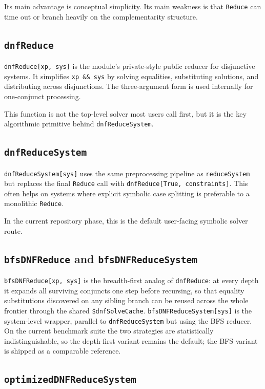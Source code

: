 \documentclass[11pt]{article}
\begin{document}
Its main advantage is conceptual simplicity. Its main weakness is that \texttt{Reduce} can time out or branch heavily on the complementarity structure.

\subsection*{\texttt{dnfReduce}}

\texttt{dnfReduce[xp, sys]} is the module's private-style public reducer for disjunctive systems. It simplifies \texttt{xp \&\& sys} by solving equalities, substituting solutions, and distributing across disjunctions. The three-argument form is used internally for one-conjunct processing.

This function is not the top-level solver most users call first, but it is the key algorithmic primitive behind \texttt{dnfReduceSystem}.

\subsection*{\texttt{dnfReduceSystem}}

\texttt{dnfReduceSystem[sys]} uses the same preprocessing pipeline as \texttt{reduceSystem} but replaces the final \texttt{Reduce} call with \texttt{dnfReduce[True, constraints]}. This often helps on systems where explicit symbolic case splitting is preferable to a monolithic \texttt{Reduce}.

In the current repository phase, this is the default user-facing symbolic solver route.

\subsection*{\texttt{bfsDNFReduce} and \texttt{bfsDNFReduceSystem}}

\texttt{bfsDNFReduce[xp, sys]} is the breadth-first analog of \texttt{dnfReduce}: at every depth it expands all surviving conjuncts one step before recursing, so that equality substitutions discovered on any sibling branch can be reused across the whole frontier through the shared \texttt{\$dnfSolveCache}. \texttt{bfsDNFReduceSystem[sys]} is the system-level wrapper, parallel to \texttt{dnfReduceSystem} but using the BFS reducer. On the current benchmark suite the two strategies are statistically indistinguishable, so the depth-first variant remains the default; the BFS variant is shipped as a comparable reference.

\subsection*{\texttt{optimizedDNFReduceSystem}}
\end{document}
